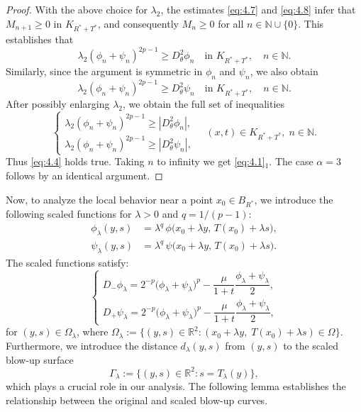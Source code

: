 \documentclass[
  sn-mathphys-num,
  colorlinks,
  linkcolor=darkmagenta,
  citecolor=rufous,
  urlcolor=zaffre,
  hypertexnames=false
]{sn-jnl}
\numberwithin{equation}{section}
\begin{document}
\begin{proof}
With the above choice for $\lambda_2$, the estimates \eqref{eq:4.7} and \eqref{eq:4.8} infer that $M_{n+1}\geq 0$ in $K_{R^{*}+T^{*}}$, and consequently $M_n\geq 0$ for all $n\in\mathbb{N}\cup\{0\}$. This establishes that
$$
\lambda_2(\phi_n+\psi_n)^{2p-1} \geq D_\theta^{2}\phi_n \quad \text{in } K_{R^{*}+T^{*}}, \quad n\in\mathbb{N}.
$$
\noindent Similarly, since the argument is symmetric in $\phi_n$ and $\psi_n$, we also obtain
\begin{equation*}
\lambda_2(\phi_n+\psi_n)^{2p-1} \ge D_{\theta}^{2}\psi_n \quad \text{in } K_{R^{*}+T^{*}}, \quad n\in\mathbb{N}.
\end{equation*}
After possibly enlarging $\lambda_2$, we obtain the full set of inequalities
$$
\begin{cases}
\lambda_2(\phi_n+\psi_n)^{2p-1} \geq |D_\theta^{2}\phi_n|, \\
\lambda_2(\phi_n+\psi_n)^{2p-1} \geq |D_\theta^{2}\psi_n|,
\end{cases}
\quad (x,t)\in K_{R^{*}+T^{*}},\; n\in\mathbb{N}.
$$
Thus \eqref{eq:4.4} holds true. 
Taking $n$ to infinity we get  \eqref{eq:4.1}$_1$.
The case $\alpha=3$ follows by an identical argument.
\end{proof}
\medskip
Now, to analyze the local behavior near a point \( x_0\in B_{R^{*}} \), we introduce the following scaled functions for \( \lambda>0 \) and \( q=1/(p-1) \):
\begin{align}
\phi_\lambda(y,s)&=\lambda^{q}\,\phi\bigl(x_0+\lambda y,\,T(x_0)+\lambda s\bigr), \label{eq:scaled-phi}\\
\psi_\lambda(y,s)&=\lambda^{q}\,\psi\bigl(x_0+\lambda y,\,T(x_0)+\lambda s\bigr). \label{eq:scaled-psi}
\end{align}
The scaled functions satisfy:
\begin{equation}
\begin{cases}
D_-\phi_\lambda
   =2^{-p}\bigl(\phi_\lambda+\psi_\lambda\bigr)^{p}
     -\dfrac{\mu}{1+t}\dfrac{\phi_\lambda+\psi_\lambda}{2},\\[6pt]
D_+\psi_\lambda
   =2^{-p}\bigl(\phi_\lambda+\psi_\lambda\bigr)^{p}
     -\dfrac{\mu}{1+t}\dfrac{\phi_\lambda+\psi_\lambda}{2},
\end{cases}
\label{fk}
\end{equation}
for \((y,s)\in\Omega_\lambda\), where
\(
\Omega_\lambda
  :=\bigl\{(y,s)\in\mathbb{R}^{2}:
           (x_0+\lambda y,\;T(x_0)+\lambda s)\in\Omega\bigr\}
\).
Furthermore, we introduce the distance \( d_\lambda(y,s) \) from \( (y,s) \) to the scaled blow-up surface
$$
\Gamma_\lambda
  :=\bigl\{(y,s)\in\mathbb{R}^{2}:s=T_\lambda(y)\bigr\},
$$
which plays a crucial role in our analysis. 
The following lemma establishes the relationship between the original and scaled blow-up curves.
\end{document}
